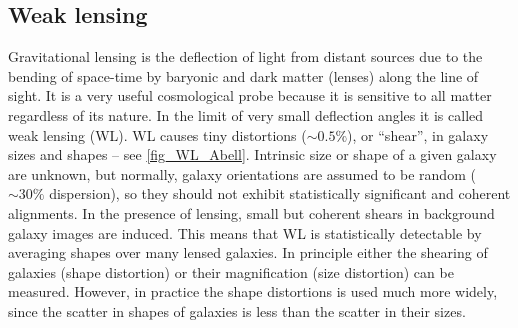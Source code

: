 \subsection{Weak lensing}
Gravitational lensing is the deflection of light from distant sources due to the bending of space-time by baryonic and dark matter (lenses) along the line of sight. It is a very useful cosmological probe because it is sensitive to all matter regardless of its nature. In the limit of very small deflection angles it is called weak lensing (WL). WL causes tiny distortions ($\sim0.5\%$), or ``shear'', in galaxy sizes and shapes -- see \autoref{fig_WL_Abell}. Intrinsic size or shape of a given galaxy are unknown, but normally, galaxy orientations are assumed to be random ($\sim30\%$ dispersion), so they should not exhibit statistically significant and coherent alignments. In the presence of lensing, small but coherent shears in background galaxy images are induced. This means that WL is statistically detectable by averaging shapes over many lensed galaxies. In principle either the shearing of galaxies (shape distortion) or their magnification (size distortion) can be measured. However, in practice the shape distortions is used much more widely, since the scatter in shapes of galaxies is less than the scatter in their sizes.


